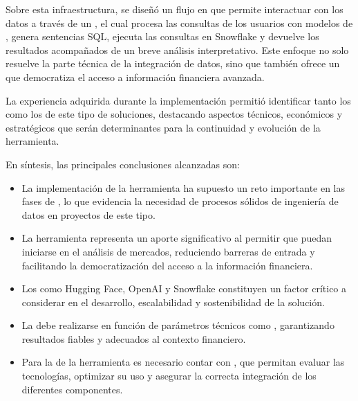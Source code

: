 \documentclass[letterpaper,10pt,spanish]{sphinxmanual}
\begin{document}
\sphinxAtStartPar
Sobre esta infraestructura, se diseñó un flujo en  que permite interactuar con los datos a través de un , el cual procesa las consultas de los usuarios con modelos de , genera sentencias SQL, ejecuta las consultas en Snowflake y devuelve los resultados acompañados de un breve análisis interpretativo. Este enfoque no solo resuelve la parte técnica de la integración de datos, sino que también ofrece un  que democratiza el acceso a información financiera avanzada.

\sphinxAtStartPar
La experiencia adquirida durante la implementación permitió identificar tanto los  como los  de este tipo de soluciones, destacando aspectos técnicos, económicos y estratégicos que serán determinantes para la continuidad y evolución de la herramienta.

\sphinxAtStartPar
En síntesis, las principales conclusiones alcanzadas son:
\begin{itemize}
\item {} 
\sphinxAtStartPar
La implementación de la herramienta ha supuesto un reto importante en las fases de , lo que evidencia la necesidad de procesos sólidos de ingeniería de datos en proyectos de este tipo.

\item {} 
\sphinxAtStartPar
La herramienta representa un aporte significativo al permitir que  puedan iniciarse en el análisis de mercados, reduciendo barreras de entrada y facilitando la democratización del acceso a la información financiera.

\item {} 
\sphinxAtStartPar
Los  como Hugging Face, OpenAI y Snowflake constituyen un factor crítico a considerar en el desarrollo, escalabilidad y sostenibilidad de la solución.

\item {} 
\sphinxAtStartPar
La  debe realizarse en función de parámetros técnicos como , garantizando resultados fiables y adecuados al contexto financiero.

\item {} 
\sphinxAtStartPar
Para la  de la herramienta es necesario contar con , que permitan evaluar las tecnologías, optimizar su uso y asegurar la correcta integración de los diferentes componentes.

\end{itemize}
\end{document}
